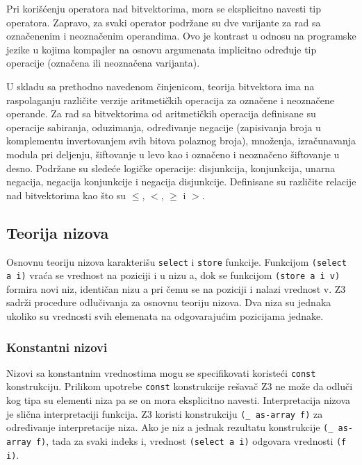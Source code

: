 \documentclass[12pt,oneside]{memoir}
\begin{document}
Pri korišćenju operatora nad bitvektorima, mora se eksplicitno navesti tip operatora. Zapravo, za svaki operator podržane su dve varijante za rad sa označenenim i neoznačenim operandima. Ovo je kontrast u odnosu na programske jezike u kojima kompajler na osnovu argumenata implicitno određuje tip operacije (označena ili neoznačena varijanta).
\par
U skladu sa prethodno navedenom činjenicom, teorija bitvektora ima na raspolaganju različite verzije aritmetičkih operacija za označene i neoznačene operande. Za rad sa bitvektorima od aritmetičkih operacija definisane su operacije sabiranja, oduzimanja, određivanje negacije (zapisivanja broja u komplementu invertovanjem svih bitova polaznog broja), množenja, izračunavanja modula pri deljenju, šiftovanje u levo kao i označeno i neoznačeno šiftovanje u desno. Podržane su sledeće logičke operacije: disjunkcija, konjunkcija, unarna negacija, negacija konjunkcije i negacija disjunkcije. Definisane su različite relacije nad bitvektorima kao što su $\leq$, $<$, $\geq$ i $>$.



\subsection{Teorija nizova} 
Osnovnu teoriju nizova karakterišu \texttt{select} i \texttt{store} funkcije. 
Funkcijom \texttt{(select a i)} vraća se vrednost na poziciji i u nizu a, dok se funkcijom \texttt{(store a i v)} formira novi niz, identičan nizu a pri čemu se na poziciji i nalazi vrednost v.
Z3 sadrži procedure odlučivanja za osnovnu teoriju nizova.
Dva niza su jednaka ukoliko su vrednosti svih elemenata na odgovarajućim pozicijama jednake.
 

\subsubsection{Konstantni nizovi}

Nizovi sa konstantnim vrednostima mogu se specifikovati koristeći \texttt{const} konstrukciju. Prilikom upotrebe \texttt{const} konstrukcije rešavač Z3 ne može da odluči kog tipa su elementi niza pa se on mora eksplicitno navesti. Interpretacija nizova je slična interpretaciji funkcija. Z3 koristi konstrukciju \texttt{(\_ as-array f)} za određivanje interpretacije niza. Ako je niz a jednak rezultatu konstrukcije \texttt{(\_ as-array f)}, tada za svaki indeks i, vrednost \texttt{(select a i)} odgovara vrednosti \texttt{(f i)}. 
\end{document}
